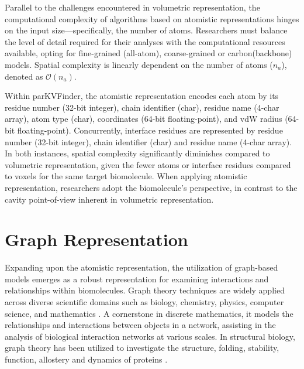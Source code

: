 \documentclass[Ingles]{phdthesis}
\begin{document}
Parallel to the challenges encountered in volumetric representation, the computational complexity of algorithms based on atomistic representations hinges on the input size---specifically, the number of atoms. Researchers must balance the level of detail required for their analyses with the computational resources available, opting for fine-grained (all-atom), coarse-grained or carbon\textalpha\space (backbone) models. Spatial complexity is linearly dependent on the number of atoms ($n_a$), denoted as $\mathcal{O}(n_a)$. 

Within parKVFinder, the atomistic representation encodes each atom by its residue number (32-bit integer), chain identifier (char), residue name (4-char array), atom type (char), coordinates (64-bit floating-point), and vdW radius (64-bit floating-point). Concurrently, interface residues are represented by residue number (32-bit integer), chain identifier (char) and residue name (4-char array). In both instances, spatial complexity significantly diminishes compared to volumetric representation, given the fewer atoms or interface residues compared to voxels for the same target biomolecule. When applying atomistic representation, researchers adopt the biomolecule's perspective, in contrast to the cavity point-of-view inherent in volumetric representation.

\section{Graph Representation \label{sec:graph-representation}}

Expanding upon the atomistic representation, the utilization of graph-based models emerges as a robust representation for examining interactions and relationships within biomolecules. Graph theory techniques are widely applied across diverse scientific domains such as biology, chemistry, physics, computer science, and mathematics \cite{foulds1995, majeed2020}. A cornerstone in discrete mathematics, it models the relationships and interactions between objects in a network, assisting in the analysis of biological interaction networks at various scales. In structural biology, graph theory has been utilized to investigate the structure, folding, stability, function, allostery and dynamics of proteins \cite{vishveshwara2002,dipaola2015,heal2018,kantelis2022}.
\end{document}
